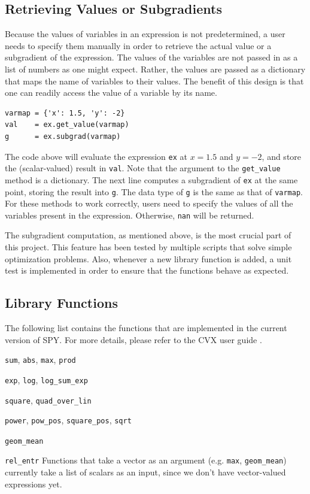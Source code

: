 \documentclass[12pt]{article}
\begin{document}
\subsection{Retrieving Values or Subgradients}
Because the values of variables in an expression is not predetermined, a user needs to specify them manually in order to retrieve the actual value or a subgradient of the expression. The values of the variables are not passed in as a list of numbers as one might expect. Rather, the values are passed as a dictionary that maps the name of variables to their values. The benefit of this design is that one can readily access the value of a variable by its name.

\begin{verbatim}
varmap = {'x': 1.5, 'y': -2}
val    = ex.get_value(varmap)
g      = ex.subgrad(varmap)
\end{verbatim}

The code above will evaluate the expression \verb'ex' at $x=1.5$ and $y=-2$, and store the (scalar-valued) result in \verb'val'. Note that the argument to the \verb'get_value' method is a dictionary. The next line computes a subgradient of \verb'ex' at the same point, storing the result into \verb'g'. The data type of \verb'g' is the same as that of \verb'varmap'. For these methods to work correctly, users need to specify the values of all the variables present in the expression. Otherwise, \verb'nan' will be returned.

The subgradient computation, as mentioned above, is the most crucial part of this project. This feature has been tested by multiple scripts that solve simple optimization problems. Also, whenever a new library function is added, a unit test is implemented in order to ensure that the functions behave as expected.

\subsection{Library Functions}
The following list contains the functions that are implemented in the current version of SPY. For more details, please refer to the CVX user guide \cite{guide}.
\BIT
\item \verb'sum', \verb'abs', \verb'max', \verb'prod'
\item \verb'exp', \verb'log', \verb'log_sum_exp'
\item \verb'square', \verb'quad_over_lin'
\item \verb'power', \verb'pow_pos', \verb'square_pos', \verb'sqrt'
\item \verb'geom_mean'
\item \verb'rel_entr'
\EIT
Functions that take a vector as an argument (e.g. \verb'max', \verb'geom_mean') currently take a list of scalars as an input, since we don't have vector-valued expressions yet.
\end{document}
